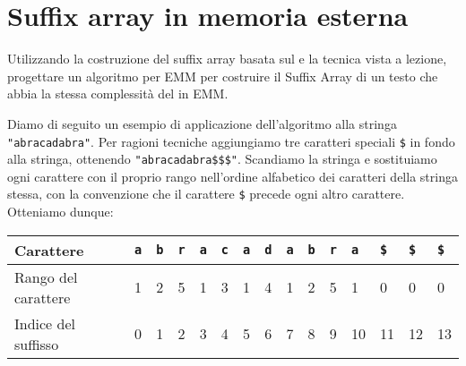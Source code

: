 \chapter{Suffix array in memoria esterna}

\begin{problem*}
  Utilizzando la costruzione del suffix array basata sul \mergesort e la tecnica
  \dc vista a lezione, progettare un algoritmo per EMM per costruire il Suffix
  Array di un testo che abbia la stessa complessit\`a del \mergesort in EMM.
\end{problem*}

Diamo di seguito un esempio di applicazione dell'algoritmo \dc alla stringa
\texttt{\string"abracadabra\string"}. Per ragioni tecniche aggiungiamo tre 
caratteri speciali \texttt{\$} in fondo alla stringa, ottenendo 
\texttt{\string"abracadabra\$\$\$\string"}. Scandiamo la stringa e sostituiamo 
ogni carattere con il proprio rango nell'ordine alfabetico dei caratteri della 
stringa stessa, con la convenzione che il carattere \texttt{\$} precede ogni altro 
carattere. Otteniamo dunque:
\begin{table}[H]
  \begin{tabularx}{\linewidth}{l*{14}{X}}
    Carattere              & \texttt{a} & \texttt{b} & \texttt{r} & \texttt{a}
                           & \texttt{c} & \texttt{a} & \texttt{d} & \texttt{a}
                           & \texttt{b} & \texttt{r} & \texttt{a} & \texttt{\$}
                           & \texttt{\$} & \texttt{\$} \\
    \hline
    Rango del carattere    & 1 & 2 & 5 & 1 & 3 & 1 & 4 & 1 & 2 & 5 & 1 & 0 & 0 & 0 \\
    Indice del suffisso    & 0 & 1 & 2 & 3 & 4 & 5 & 6 & 7 & 8 & 9 & 10 & 11 & 12 & 13 \\
  \end{tabularx}
\end{table}

